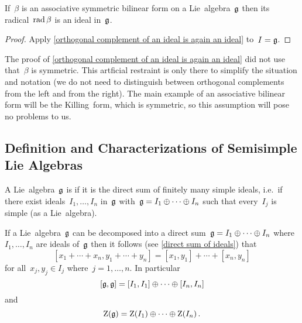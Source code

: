 \begin{corollary}
  \label{radical of bilinear form is an ideal}
  If~$\beta$ is an associative symmetric bilinear form on a Lie~algebra~$\mathfrak{g}$ then its radical~$\operatorname{rad} \beta$ is an ideal in~$\mathfrak{g}$.
\end{corollary}


\begin{proof}
  Apply \cref{orthogonal complement of an ideal is again an ideal} to~$I = \mathfrak{g}$.
\end{proof}


\begin{remark}
 The proof of \ref{orthogonal complement of an ideal is again an ideal} did not use that~$\beta$ is symmetric.
 This artficial restraint is only there to simplify the situation and notation (we do not need to distinguish between orthogonal complements from the left and from the right).
 The main example of an associative bilinear form will be the Killing~form, which is symmetric, so this assumption will pose no problems to us.
\end{remark}





\subsection{Definition and Characterizations of Semisimple Lie Algebras}



\begin{definition}
  A Lie~algebra~$\mathfrak{g}$ is  if it is the direct sum of finitely many simple ideals, i.e.\ if there exist ideals~$I_1, \dotsc, I_n$ in~$\mathfrak{g}$ with~$\mathfrak{g} = I_1 \oplus \dotsb \oplus I_n$ such that every~$I_j$ is simple (as a Lie~algebra).
\end{definition}


\begin{recall}
  If a Lie~algebra~$\mathfrak{g}$ can be decomposed into a direct sum~$\mathfrak{g} = I_1 \oplus \dotsb \oplus I_n$ where~$I_1, \dotsc, I_n$ are ideals of~$\mathfrak{g}$ then it follows (see \cref{direct sum of ideals}) that
  \[
    [x_1 + \dotsb + x_n, y_1 + \dotsb + y_n]
    =
    [x_1, y_1] + \dotsb + [x_n, y_n]
  \]
  for all~$x_j, y_j \in I_j$ where~$j = 1, \dotsc, n$.
  In particular
  \[
    [\mathfrak{g}, \mathfrak{g}]
    =
    [I_1, I_1] \oplus \dotsb \oplus [I_n, I_n]
  \]
  and
  \[
    \operatorname{Z}(\mathfrak{g})
    =
    \operatorname{Z}(I_1) \oplus \dotsb \oplus \operatorname{Z}(I_n)  \,.
  \]
\end{recall}


